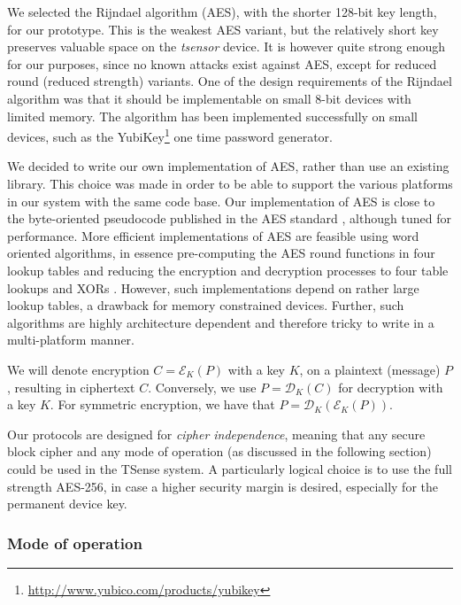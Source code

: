 We selected the Rijndael algorithm (AES), with the shorter 128-bit key length, for our prototype. This is the weakest AES variant, but the relatively short key preserves valuable space on the \textit{tsensor} device. It is however quite strong enough for our purposes, since no known attacks exist against AES, except for reduced round (reduced strength) variants. One of the design requirements of the Rijndael algorithm was that it should be implementable on small 8-bit devices with limited memory. The algorithm has been implemented successfully on small devices, such as the YubiKey\footnote{\url{http://www.yubico.com/products/yubikey}} one time password generator.

We decided to write our own implementation of AES, rather than use an existing library. This choice was made in order to be able to support the various platforms in our system with the same code base. Our implementation of AES is close to the byte-oriented pseudocode published in the AES standard , although tuned for performance. More efficient implementations of AES are feasible using word oriented algorithms, in essence pre-computing the AES round functions in four lookup tables and reducing the encryption and decryption processes to four table lookups and XORs \cite[Section 5.2]{daemen1999}. However, such implementations depend on rather large lookup tables, a drawback for memory constrained devices. Further, such algorithms are highly architecture dependent and therefore tricky to write in a multi-platform manner. 

We will denote encryption $C=\mathcal{E}_K(P)$ with a key $K$, on a plaintext (message) $P$, resulting in ciphertext $C$. Conversely, we use $P=\mathcal{D}_K(C)$ for decryption with a key $K$. For symmetric encryption, we have that $P=\mathcal{D}_K(\mathcal{E}_K(P))$.

Our protocols are designed for \textit{cipher independence}, meaning that any secure block cipher and any mode of operation (as discussed in the following section) could be used in the TSense system. A particularly logical choice is to use the full strength AES-256, in case a higher security margin is desired, especially for the permanent device key.

\subsubsection{Mode of operation}

